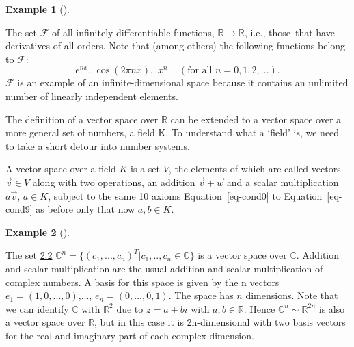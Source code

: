 \documentclass[
  a4paper,
  DIV=11,
  numbers=noendperiod,
  oneside]{scrreprt}
\theoremstyle{definition}
\newtheorem{example}{Example}[chapter]
\theoremstyle{remark}
\newenvironment{fbxSimple}[3]{\begin{tcolorbox}[enhanced, breakable,%
attach boxed title to top*={xshift=1.4pt},
boxed title style={boxrule=0.0mm, fuzzy shadow={1pt}{-1pt}{0mm}{0.1mm}{gray}, arc=.3em, rounded corners=east, sharp corners=west}, colframe=#1-color2, colbacktitle=#1-color1, colback = white, coltitle=black,  titlerule=0mm, toprule=0pt, bottomrule=.7pt, leftrule=.3em, rightrule=.7pt, outer arc=.3em,  	left=.5em, right=.5em, bottomtitle=1mm, toptitle=1mm,title=\textbf{#2}\hspace{0.5em}{#3}]}
{\end{tcolorbox}}
\begin{document}
\begin{tcolorbox}[enhanced jigsaw, colframe=quarto-callout-note-color-frame, breakable, colbacktitle=quarto-callout-note-color!10!white, colback=white, left=2mm, opacityback=0, opacitybacktitle=0.6, coltitle=black, toptitle=1mm, bottomrule=.15mm, leftrule=.75mm, title=\textcolor{quarto-callout-note-color}{\faInfo}\hspace{0.5em}{Advanced material}, arc=.35mm, rightrule=.15mm, toprule=.15mm, titlerule=0mm, bottomtitle=1mm]

\begin{example}[]\protect\hypertarget{exm-vktspace8}{}\label{exm-vktspace8}

The set \(\mathcal{F}\) of all infinitely differentiable functions,
\(\mathbb{R} \rightarrow \mathbb{R}\), i.e., those~that have derivatives
of all orders. Note that (among others) the following functions belong
to \(\mathcal{F}\): \[e^{nx},\,\cos \left( 2\pi nx\right)
,\,\,x^{n}\quad \,(\text{for all }n=0,1,2,...).\] \(\mathcal{F}\) is an
example of an infinite-dimensional space because it contains an
unlimited number of linearly independent elements.

\end{example}

The definition of a vector space over \(\mathbb{R}\) can be extended to
a vector space over a more general set of numbers, a field K. To
understand what a `field' is, we need to take a short detour into number
systems.

\label{vksoverk}
\begin{fbxSimple}{Definition}{Definition: }{Vector Space over K}
\label{vksoverk}
A vector space over a field \(K\) is a set \(V\), the elements of which
are called vectors \(\vec{v} \in V\) along with two operations, an
addition \(\vec{v} + \vec{w}\) and a scalar multiplication
\(a \vec{v}\), \(a \in K\), subject to the same 10 axioms
Equation~\ref{eq-cond0} to Equation~\ref{eq-cond9} as before only that
now \(a,b\in K\).

\end{fbxSimple}

\begin{example}[]\protect\hypertarget{exm-vktspace9}{}\label{exm-vktspace9}

The set \hyperref[vksoverk]{2.2}
\(\mathbb{C}^{n} =\{ (c_{1},...,c_{n})^{T}| c_{1},..,c_{n}\in \mathbb{C}\}\)
is a vector space over \(\mathbb{C}\). Addition and scalar
multiplication are the usual addition and scalar multiplication of
complex numbers. A basis for this space is given by the n vectors
\(e_{1}=(1,0,...,0)\),..., \(e_{n}=(0,...,0,1)\). The space has \(n\)
dimensions. Note that we can identify \(\mathbb{C}\) with
\(\mathbb{R}^{2}\) due to \(z= a + b i\) with \(a,b \in \mathbb{R}\).
Hence \(\mathbb{C}^{n}  \sim \mathbb{R}^{2n}\) is also a vector space
over \(\mathbb{R}\), but in this case it is 2n-dimensional with two
basis vectors for the real and imaginary part of each complex dimension.

\end{example}

\end{tcolorbox}
\end{document}
